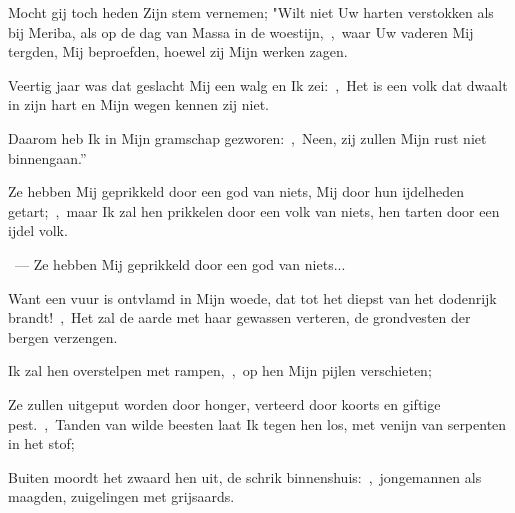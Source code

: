 \documentclass[12pt,twoside,a5paper]{article}
\begin{document}
\begin{halfparskip}

  Mocht gij toch heden Zijn stem vernemen; "Wilt niet Uw harten verstokken als bij Meriba, als op de dag van Massa in de woestijn,~\sep\ waar Uw vaderen Mij tergden, Mij beproefden, hoewel zij Mijn werken zagen.

  Veertig jaar was dat geslacht Mij een walg en Ik zei:~\sep\ Het is een volk dat dwaalt in zijn hart en Mijn wegen kennen zij niet.

  Daarom heb Ik in Mijn gramschap gezworen:~\sep\ Neen, zij zullen Mijn rust niet binnengaan.''
\end{halfparskip}


\begin{halfparskip}
   Ze hebben Mij geprikkeld door een god van niets, Mij door hun ijdelheden getart;~\sep\ maar Ik zal hen prikkelen door een volk van niets, hen tarten door een ijdel volk.

  ~---  Ze hebben Mij geprikkeld door een god van niets...

  Want een vuur is ontvlamd in Mijn woede, dat tot het diepst van het dodenrijk brandt!~\sep\ Het zal de aarde met haar gewassen verteren, de grondvesten der bergen verzengen.

  Ik zal hen overstelpen met rampen,~\sep\ op hen Mijn pijlen verschieten;

  Ze zullen uitgeput worden door honger, verteerd door koorts en giftige pest.~\sep\ Tanden van wilde beesten laat Ik tegen hen los, met venijn van serpenten in het stof;

  Buiten moordt het zwaard hen uit, de schrik binnenshuis:~\sep\ jongemannen als maagden, zuigelingen met grijsaards.
\end{halfparskip}
\end{document}
